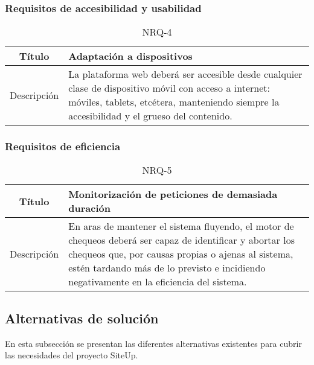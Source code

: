 \FloatBarrier
\subsubsection{Requisitos de accesibilidad y usabilidad}

\begin{table}[h!]
  \centering
  \begin{tabularx}{\textwidth}{|c|X|}
    \hline
    Título & Adaptación a dispositivos \\

    \hline

    Descripción & La plataforma web deberá ser accesible desde cualquier clase
    de dispositivo móvil con acceso a internet: móviles, tablets, etcétera,
    manteniendo siempre la accesibilidad y el grueso del contenido. \\

    \hline
  \end{tabularx}
  \caption{NRQ-4}
\end{table}


\FloatBarrier
\subsubsection{Requisitos de eficiencia}

\begin{table}[H]
  \centering
  \begin{tabularx}{\textwidth}{|c|X|}
    \hline
    Título & Monitorización de peticiones de demasiada duración \\

    \hline

    Descripción & En aras de mantener el sistema fluyendo, el motor de chequeos
    deberá ser capaz de identificar y abortar los chequeos que, por causas
    propias o ajenas al sistema, estén tardando más de lo previsto e incidiendo
    negativamente en la eficiencia del sistema. \\

    \hline
  \end{tabularx}
  \caption{NRQ-5}
\end{table}

\subsection{Alternativas de solución}

En esta subsección se presentan las diferentes alternativas existentes para
cubrir las necesidades del proyecto SiteUp.

